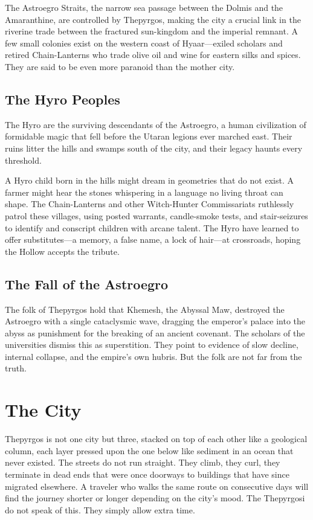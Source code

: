 \documentclass[10pt,twocolumn]{book}
\begin{document}
The Astroegro Straits, the narrow sea passage between the Dolmis and the Amaranthine, are controlled by Thepyrgos, making the city a crucial link in the riverine trade between the fractured sun-kingdom and the imperial remnant. A few small colonies exist on the western coast of Hyaar---exiled scholars and retired Chain-Lanterns who trade olive oil and wine for eastern silks and spices. They are said to be even more paranoid than the mother city.

\subsection{The Hyro Peoples}

The Hyro are the surviving descendants of the Astroegro, a human civilization of formidable magic that fell before the Utaran legions ever marched east. Their ruins litter the hills and swamps south of the city, and their legacy haunts every threshold.

A Hyro child born in the hills might dream in geometries that do not exist. A farmer might hear the stones whispering in a language no living throat can shape. The Chain-Lanterns and other Witch-Hunter Commissariats ruthlessly patrol these villages, using posted warrants, candle-smoke tests, and stair-seizures to identify and conscript children with arcane talent. The Hyro have learned to offer substitutes---a memory, a false name, a lock of hair---at crossroads, hoping the Hollow accepts the tribute.

\subsection{The Fall of the Astroegro}

The folk of Thepyrgos hold that Khemesh, the Abyssal Maw, destroyed the Astroegro with a single cataclysmic wave, dragging the emperor's palace into the abyss as punishment for the breaking of an ancient covenant. The scholars of the universities dismiss this as superstition. They point to evidence of slow decline, internal collapse, and the empire's own hubris. But the folk are not far from the truth.

\section{The City}

Thepyrgos is not one city but three, stacked on top of each other like a geological column, each layer pressed upon the one below like sediment in an ocean that never existed. The streets do not run straight. They climb, they curl, they terminate in dead ends that were once doorways to buildings that have since migrated elsewhere. A traveler who walks the same route on consecutive days will find the journey shorter or longer depending on the city's mood. The Thepyrgosi do not speak of this. They simply allow extra time.
\end{document}
